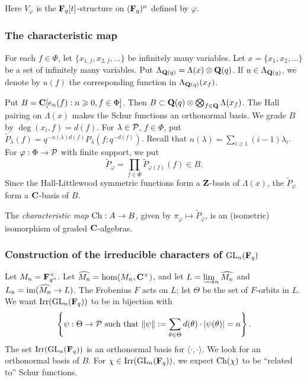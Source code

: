 Here $V_\varphi$ is the $\mathbf{F}_q[t]$-structure on $(\mathbf{F}_q)^n$ defined by 
$\varphi$. 





\subsubsection{The characteristic map}

For each $f\in \Phi$, let $\{x_{1,f},x_{2,f},\dots\}$ be infinitely many 
variables. Let $x=\{x_1,x_2,\dots\}$ be a set of infinitely many variables. 
Put $\Lambda_{\mathbf{Q}(q)} = \Lambda(x)\otimes \mathbf{Q}(q)$. If 
$u\in \Lambda_{\mathbf{Q}(q)}$, we denote by 
$u(f)$ the corresponding function in 
$\Lambda_{\mathbf{Q}(q)}(x_f)$. 

Put $B=\mathbf{C}[e_n(f):n\geqslant 0, f\in \Phi]$. Then 
$B\subset \mathbf{Q}(q)\otimes \bigotimes_{f\in \mathbf{Q}} \Lambda(x_f)$. The Hall pairing on 
$\Lambda(x)$ makes the Schur functions an orthonormal basis. We grade $B$ by 
$\deg(x_i,f) = d(f)$. For $\lambda\in \mathcal{P}$, $f\in \Phi$, put 
$\widetilde P_\lambda(f) = q^{-n(\lambda) d(f)} P_\lambda(f; q^{-d(f)})$. Recall 
that $n(\lambda) = \sum_{i\geqslant 1} (i-1) \lambda_i$. 
For $\varphi:\Phi \to \mathcal{P}$ with finite support, we put 
\[
  \widetilde P_\varphi = \prod_{f\in \Phi} \widetilde P_{\varphi(f)} (f) \in B .
\]
Since the Hall-Littlewood symmetric functions form a $\mathbf{Z}$-basis of 
$\Lambda(x)$, the $\widetilde P_\varphi$ form a $\mathbf{C}$-basis of $B$. 

The \emph{characteristic map} $\operatorname{Ch}:A\to B$, given by 
$\pi_\varphi\mapsto \widetilde P_\varphi$, is an (isometric) isomorphism of 
graded $\mathbf{C}$-algebras. 


\subsubsection{Construction of the irreducible characters of \texorpdfstring{$\operatorname{GL}_n(\mathbf{F}_q)$}{GLnFq}}

Let $M_n=\mathbf{F}_{q^n}^\times$. Let $\widehat{M_n} = \hom(M_n,\mathbf{C}^\times)$, and let 
$L=\varinjlim_n \widehat{M_n}$ and $L_n=\operatorname{im}(\widehat{M_n} \to L)$. The 
Frobenius $F$ acts on $L$; let $\Theta$ be the set of $F$-orbits in $L$. 
We want $\operatorname{Irr}(\operatorname{GL}_n(\mathbf{F}_q))$ to be in bijection with 
\[
  \left\{\psi:\Theta\to \mathcal{P}\text{ such that }\|\psi\| := \sum_{\theta\in \Theta} d(\theta) \cdot |\psi(\theta)| = n\right\} .
\]
The set $\operatorname{Irr}(\operatorname{GL}_n(\mathbf{F}_q))$ is an orthonormal basis for 
$\langle \cdot,\cdot\rangle$. We look for an orthonormal basis of $B$. For 
$\chi\in \operatorname{Irr}(\operatorname{GL}_n(\mathbf{F}_q))$, we expect 
$\operatorname{Ch}(\chi)$ to be ``related to'' Schur functions. 

